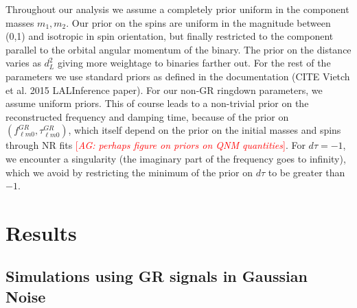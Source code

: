 \documentclass[twocolumn,prd,aps,superscriptaddress,preprintnumbers,tightenlines,showpacs,nofootinbib,eqsecnum,amsfonts,amsmath]{revtex4-1}
\newcommand{\abhi}[1]{\textcolor{red}{[\textit{AG: #1}]}}
\begin{document}
Throughout our analysis we assume a completely prior uniform in the component masses $m_1, m_2$. Our prior on the spins are uniform in the magnitude between (0,1) and isotropic in spin orientation, but finally restricted to the component parallel to the orbital angular momentum of the binary. The prior on the distance varies as $d_L^2$ giving more weightage to binaries farther out. For the rest of the parameters we use standard priors as defined in the documentation (CITE Vietch et al. 2015 LALInference paper). For our non-GR ringdown parameters, we assume uniform priors. This of course leads to a non-trivial prior on the reconstructed frequency and damping time, because of the prior on $( f_{\ell m 0}^{GR},\tau_{\ell m 0}^{GR})$, which itself depend on the prior on the initial masses and spins through NR fits \abhi{perhaps figure on priors on QNM quantities}. For $d\tau = -1$, we encounter a singularity (the imaginary part of the frequency goes to infinity), which we avoid by restricting the minimum of the prior on $d\tau$ to be greater than $-1$.
\fi

\section{Results}\label{sec:results}

\subsection{Simulations using GR signals in Gaussian Noise}\label{ssec:gr_signal}
\end{document}
